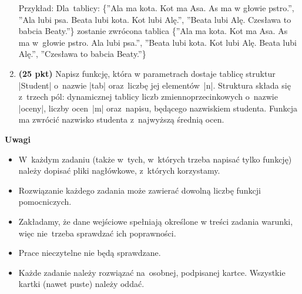 \documentclass[extrafontsizes,10pt]{article}
\begin{document}
\begin{enumerate}
\noindent
Przykład:
Dla~tablicy: 
\{''Ala ma kota. Kot ma Asa. As ma w głowie pstro.'',
''Ala lubi psa. Beata lubi kota. Kot lubi Alę.'',
''Beata lubi Alę. Czesława to babcia Beaty.''\}
zostanie zwrócona tablica
\{''Ala ma kota. Kot ma Asa. As ma w~głowie pstro. Ala lubi psa.'',
''Beata lubi kota. Kot lubi Alę. Beata lubi Alę.'',
''Czesława to babcia Beaty.''\}


\item \textbf{(25 pkt)}
Napisz funkcję, która w parametrach dostaje tablicę struktur |Student|
o~nazwie |tab| oraz~liczbę jej elementów~|n|.
Struktura składa się z~trzech pól: dynamicznej tablicy liczb zmiennoprzecinkowych
o~nazwie |oceny|, liczby ocen~|m| oraz~napisu, będącego nazwiskiem studenta.
Funkcja ma zwrócić nazwisko studenta z~najwyższą średnią ocen.

\end{enumerate}

\vfill

\textbf{Uwagi}

\begin{itemize}
 \item  W~każdym zadaniu (także w~tych, w~których trzeba napisać tylko funkcję)
        należy dopisać pliki nagłówkowe, z~których korzystamy.
 \item  Rozwiązanie każdego zadania może zawierać dowolną liczbę funkcji pomocniczych.
 \item  Zakładamy, że dane wejściowe spełniają określone w treści zadania warunki,
        więc nie~trzeba sprawdzać ich poprawności.
 \item  Prace nieczytelne nie będą sprawdzane.
 \item  Każde zadanie należy rozwiązać na~osobnej, podpisanej kartce.
        Wszystkie kartki (nawet puste) należy oddać.
\end{itemize}
\end{document}
